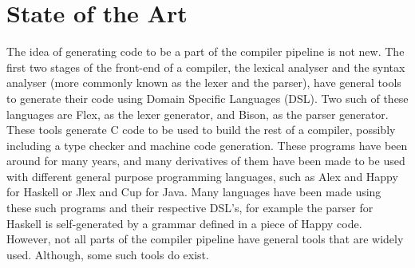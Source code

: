 \chapter{State of the Art}

The idea of generating code to be a part of the compiler pipeline is not new.
The first two stages of the front-end of a compiler, the lexical analyser and the syntax analyser (more commonly known as the lexer and the parser), have general tools to generate their code using Domain Specific Languages (DSL)\cite{Bentley:1986:PPL:6424.315691,van2000domain}.
Two such of these languages are Flex\cite{Levine:2009:FB:1696439}, as the lexer generator, and Bison\cite{Levine:2009:FB:1696439}, as the parser generator.
These tools generate C code to be used to build the rest of a compiler, possibly including a type checker and machine code generation.
These programs have been around for many years, and many derivatives of them have been made to be used with different general purpose programming languages, such as Alex and Happy for Haskell or Jlex and Cup for Java\cite{ranta2012implementing}.
Many languages have been made using these such programs and their respective DSL's, for example the parser for Haskell is self-generated by a grammar defined in a piece of Happy code.
However, not all parts of the compiler pipeline have general tools that are widely used.
Although, some such tools do exist\cite{grimm2007typical,ruler}.


